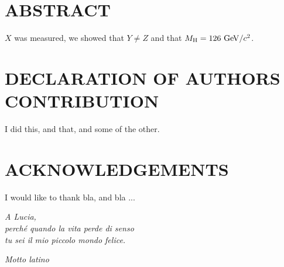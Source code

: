 \chapter*{ABSTRACT}
%
$X$ was measured, we showed that $Y \neq Z$ and that $M_{\rm H} = 126 \GeV/c^2$.
%
\clearpage
\chapter*{DECLARATION OF AUTHORS CONTRIBUTION}
%
I did this, and that, and some of the other.
%
\clearpage
\chapter*{ACKNOWLEDGEMENTS}
%
I would like to thank bla, and bla ...
%
\cleardoublepage
~

\begin{flushright}
  \emph{A Lucia, \\
  perch\'{e} quando la vita perde di senso \\
  tu sei il mio piccolo mondo felice.}
  
  \vspace{10cm}
  
   \emph{Motto latino} 
\end{flushright}

\cleardoublepage
